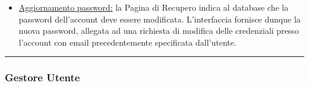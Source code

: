 \documentclass[11pt, a4paper]{article}
\theoremstyle{definition} %
\begin{document}
\begin{description}
\begin{itemize}
        \item \underline{Aggiornamento password:} la Pagina di
        Recupero indica al database che la password dell'account
        deve essere modificata. L'interfaccia fornisce dunque
        la nuova password, allegata ad una richiesta di modifica
        delle credenziali presso l'account con email precedentemente
        specificata dall'utente.
    \end{itemize}
\end{description}

\begin{center}
    \rule{5cm}{1pt}
\end{center}

\subsubsection{Gestore Utente}
\end{document}
